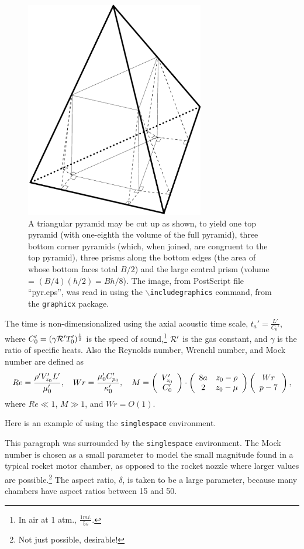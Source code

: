 \begin{figure}
\centerline{\includegraphics[height=95mm]{pyr}}
\caption[Cutting up a triangular pyramid]{
	A triangular pyramid may be cut up as shown, to
	yield one top pyramid (with one-eighth the volume
	of the full pyramid), three bottom corner pyramids
	(which, when joined, are congruent to the top pyramid),
	three prisms along the bottom edges (the area of whose
	bottom faces total $B/2$) and the large central prism
	(volume = $(B/4)(h/2) = Bh/8$).
	The image, from PostScript file ``pyr.eps'',
	was read in using the {\tt $\backslash$includegraphics}
	command, from the {\tt graphicx} package.
	}
\label{fig:pyramid}
\end{figure}

The time is non-dimensionalized using the
axial acoustic time scale,
$t_a'=\frac{L'}{C_0'}$, where
$C_0'=(\gamma {\cal R} ' T_0')^{\frac12}$
is the speed of
sound,\footnote{In air at 1 atm., $\frac{1 mi.}{5 s}$.}
$\cal{R}'$ is the gas constant,
and $\gamma$ is the ratio of specific heats.
Also the Reynolds number, Wrenchl number,
and Mock number are defined as
\begin{displaymath}
	Re = \frac{\rho' V_{z_0}' L'}{ \mu_0'}, \quad
	Wr = \frac{\mu_0' C_{p_0}'}{\kappa_0'}, \quad
	M = \left(\begin{array}{c} V_{z_0}' \\ C_0' \end{array}\right) \cdot
		\left(\begin{array}{cc} 8a & z_0-\rho \\ 2 & z_0-\mu \end{array}\right) \left(\begin{array}{c} Wr \\ p-7 \end{array}\right),
\end{displaymath}
where $Re\ll1$, $M\gg1$, and $Wr=O(1)$.

Here is an example of using the \texttt{singlespace} environment.

\begin{singlespace}
  This paragraph was surrounded by the \texttt{singlespace}
  environment. The Mock number is chosen as a small parameter to
  model the small magnitude found in a typical rocket motor chamber,
  as opposed to the rocket nozzle where larger values are
  possible.\footnote{Not just possible, desirable!} The aspect
  ratio, $\delta$, is taken to be a large parameter, because many
  chambers have aspect ratios between 15 and 50.
\end{singlespace}

